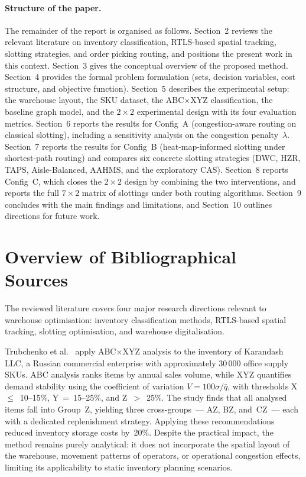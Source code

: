 \documentclass[12pt,a4paper]{article}
\begin{document}
\paragraph{Structure of the paper.}
The remainder of the report is organised as follows.
Section~2 reviews the relevant literature on inventory classification,
RTLS-based spatial tracking, slotting strategies, and order picking routing,
and positions the present work in this context.
Section~3 gives the conceptual overview of the proposed method.
Section~4 provides the formal problem formulation (sets, decision variables,
cost structure, and objective function).
Section~5 describes the experimental setup: the warehouse layout, the SKU
dataset, the ABC$\times$XYZ classification, the baseline graph model, and
the $2 \times 2$ experimental design with its four evaluation metrics.
Section~6 reports the results for Config~A (congestion-aware routing on
classical slotting), including a sensitivity analysis on the congestion
penalty~$\lambda$.
Section~7 reports the results for Config~B (heat-map-informed slotting
under shortest-path routing) and compares six concrete slotting strategies
(DWC, HZR, TAPS, Aisle-Balanced, AAHMS, and the exploratory CAS).
Section~8 reports Config~C, which closes the $2 \times 2$ design by
combining the two interventions, and reports the full $7 \times 2$ matrix
of slottings under both routing algorithms.
Section~9 concludes with the main findings and limitations,
and Section~10 outlines directions for future work.

\section{Overview of Bibliographical Sources}

The reviewed literature covers four major research directions relevant to warehouse
optimisation: inventory classification methods, RTLS-based spatial tracking, slotting
optimisation, and warehouse digitalisation.

Trubchenko et al.~\cite{ref1} apply ABC$\times$XYZ analysis to the inventory of
Karandash LLC, a Russian commercial enterprise with approximately 30\,000 office supply
SKUs. ABC analysis ranks items by annual sales volume, while XYZ quantifies demand
stability using the coefficient of variation $V = 100\sigma/\bar{q}$, with thresholds
X~$\leq$~10--15\%, Y~=~15--25\%, and Z~$>$~25\%. The study finds that all analysed
items fall into Group~Z, yielding three cross-groups~--- AZ, BZ, and~CZ~--- each with a
dedicated replenishment strategy. Applying these recommendations reduced inventory storage
costs by~20\%. Despite the practical impact, the method remains purely analytical:
it does not incorporate the spatial layout of the warehouse, movement patterns of operators,
or operational congestion effects, limiting its applicability to static inventory
planning scenarios.
\end{document}
